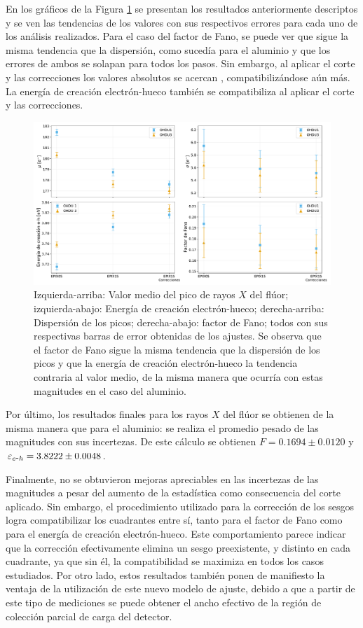 En los gráficos de la Figura \ref{fig:F_mu_sigma_fano_eh} se presentan los resultados anteriormente descriptos y se ven las tendencias de los valores con sus respectivos errores para cada uno de los análisis realizados. Para el caso del factor de Fano, se puede ver que sigue la misma tendencia que la dispersión, como sucedía para el aluminio y que los errores de ambos se solapan para todos los pasos. Sin embargo, al aplicar el corte y las correcciones los valores absolutos se acercan , compatibilizándose aún más. La energía de creación electrón-hueco también se compatibiliza al aplicar el corte y las correcciones.
\begin{figure}[h]
    \centering
        \includegraphics[scale=0.45]{Figs/F_mu_sigma_fano_Eeh.pdf}
    \caption{Izquierda-arriba: Valor medio del pico de rayos $X$ del flúor; izquierda-abajo: Energía de creación electrón-hueco; derecha-arriba: Dispersión de los picos; derecha-abajo: factor de Fano; todos con sus respectivas barras de error obtenidas de los ajustes. Se observa que el factor de Fano sigue la misma tendencia que la dispersión de los picos y que la energía de creación electrón-hueco la tendencia contraria al valor medio, de la misma manera que ocurría con estas magnitudes en el caso del aluminio.}
    \label{fig:F_mu_sigma_fano_eh}
\end{figure}

Por último, los resultados finales para los rayos $X$ del flúor se obtienen de la misma manera que para el aluminio:  se realiza el promedio pesado de las magnitudes con sus incertezas. De este cálculo se obtienen $F = 0.1694 \pm 0.0120 $ y $\varepsilon_{e\mbox{-}h} = 3.8222 \pm 0.0048$.

Finalmente, no se obtuvieron mejoras apreciables en las incertezas de las magnitudes a pesar del aumento de la estadística como consecuencia del corte aplicado. Sin embargo, el procedimiento utilizado para la corrección de los sesgos logra compatibilizar los cuadrantes entre sí, tanto para el factor de Fano como para el energía de creación electrón-hueco. Este comportamiento parece indicar que la corrección efectivamente elimina un sesgo preexistente, y distinto en cada cuadrante, ya que sin él, la compatibilidad se maximiza en todos los casos estudiados.
Por otro lado, estos resultados también ponen de manifiesto la ventaja de la utilización de este nuevo modelo de ajuste, debido a que a partir de este tipo de mediciones se puede obtener el ancho efectivo de la región de colección parcial de carga del detector.

